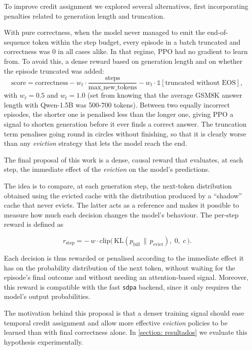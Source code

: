 To improve credit assignment we explored several alternatives, first incorporating penalties related to generation length and truncation.

With pure correctness, when the model never managed to emit the end-of-sequence token within the step budget, every episode in a batch truncated and correctness was $0$ in all cases alike. In that regime, PPO had no gradient to learn from. To avoid this, a dense reward based on generation length and on whether the episode truncated was added:
\[
    \mathrm{score} = \mathrm{correctness} - w_\ell\cdot\frac{\mathrm{steps}}{\mathrm{max\_new\_tokens}} - w_t\cdot \mathds{1} [\text{truncated without EOS}],
\]
with $w_\ell=0.5$ and $w_t=1.0$ (set from knowing that the average GSM8K answer length with Qwen-1.5B was 500-700 tokens). Between two equally incorrect episodes, the shorter one is penalised less than the longer one, giving PPO a signal to shorten generation before it ever finds a correct answer. The truncation term penalises going round in circles without finishing, so that it is clearly worse than any \textit{eviction} strategy that lets the model reach the end.

The final proposal of this work is a dense, causal reward that evaluates, at each step, the immediate effect of the \textit{eviction} on the model's predictions.

The idea is to compare, at each generation step, the next-token distribution obtained using the evicted cache with the distribution produced by a ``shadow'' cache that never evicts. The latter acts as a reference and makes it possible to measure how much each decision changes the model's behaviour. The per-step reward is defined as

\[
    r_{\text{step}} = -\,w \cdot \mathrm{clip}\big(\, \mathrm{KL}(p_{\text{full}} \,\|\, p_{\text{evict}}),\; 0,\; c \,\big).
\]

Each decision is thus rewarded or penalised according to the immediate effect it has on the probability distribution of the next token, without waiting for the episode's final outcome and without needing an attention-based signal. Moreover, this reward is compatible with the fast \texttt{sdpa} backend, since it only requires the model's output probabilities.

The motivation behind this proposal is that a denser training signal should ease temporal credit assignment and allow more effective \textit{eviction} policies to be learned than with final correctness alone. In \cref{section: resultados} we evaluate this hypothesis experimentally.



